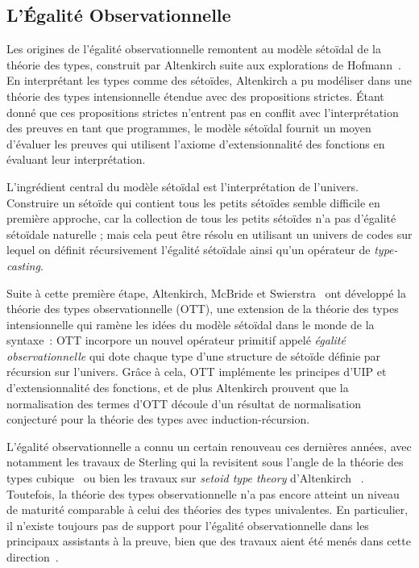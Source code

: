 \subsection{L'Égalité Observationnelle}

Les origines de l'égalité observationnelle remontent au modèle sétoïdal de la 
théorie des types, construit par Altenkirch suite aux explorations de 
Hofmann~\cite{hofmann95,altenkirch99}.
% 
En interprétant les types comme des sétoïdes, Altenkirch a pu modéliser
dans une théorie des types intensionnelle étendue avec des propositions strictes. 
Étant donné que ces propositions strictes n'entrent pas en conflit avec l'interprétation 
des preuves en tant que programmes, le modèle sétoïdal fournit un moyen d'évaluer les 
preuves qui utilisent l'axiome d'extensionnalité des fonctions en évaluant leur 
interprétation.

L'ingrédient central du modèle sétoïdal est l'interprétation de l'univers. 
% 
Construire un sétoïde qui contient tous les petits sétoïdes semble difficile 
en première approche, car la collection de tous les petits sétoïdes n'a pas 
d'égalité sétoïdale naturelle ; mais cela peut être résolu en utilisant un univers 
de codes sur lequel on définit récursivement l'égalité sétoïdale 
ainsi qu'un opérateur de \emph{type-casting}.

Suite à cette première étape, Altenkirch, McBride et 
Swierstra~ ont développé la théorie des types 
observationnelle (OTT), une extension de la théorie des types intensionnelle 
qui ramène les idées du modèle sétoïdal dans le monde de la syntaxe~: 
% 
OTT incorpore un nouvel opérateur primitif appelé 
\emph{égalité observationnelle} qui dote chaque type d'une structure de sétoïde 
définie par récursion sur l'univers. 
% 
Grâce à cela, OTT implémente les principes d'UIP et d'extensionnalité des 
fonctions, et de plus Altenkirch \etal prouvent que la normalisation des termes 
d'OTT découle d'un résultat de normalisation conjecturé pour la théorie des types 
avec induction-récursion.

L'égalité observationnelle a connu un certain renouveau ces dernières années, 
avec notamment les travaux de Sterling \etal qui la revisitent sous l'angle 
de la théorie des types cubique~ ou bien
les travaux sur \emph{setoid type theory} d'Altenkirch \etal~. 
% 
Toutefois, la théorie des types observationnelle n'a pas encore atteint un niveau 
de maturité comparable à celui des théories des types univalentes. 
% 
En particulier, il n'existe toujours pas de support pour l'égalité 
observationnelle dans les principaux assistants à la preuve, bien que des
travaux aient été menés dans cette direction~.


